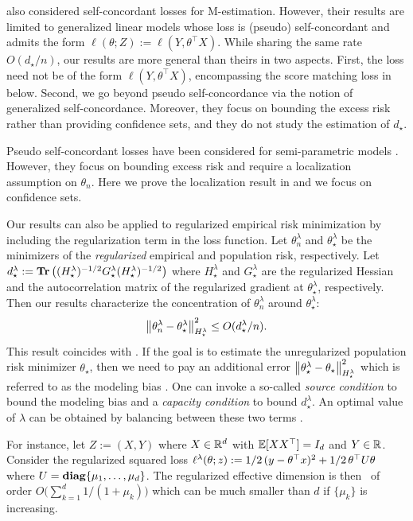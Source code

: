 \citet{ostrovskii2021finite} also considered self-concordant losses for M-estimation.
However, their results are limited to generalized linear models whose loss is (pseudo) self-concordant and admits the form $\ell(\theta; Z) := \ell(Y, \theta^\top X)$.
While sharing the same rate $O(d_\star / n)$, our results are more general than theirs in two aspects.
First, the loss need not be of the form $\ell(Y, \theta^\top X)$, encompassing the score matching loss in  below.
Second, we go beyond pseudo self-concordance via the notion of generalized self-concordance.
Moreover, they focus on bounding the excess risk rather than providing confidence sets, and they do not study the estimation of $d_\star$.

Pseudo self-concordant losses have been considered for semi-parametric models \citep{liu2022orthogonal}.
However, they focus on bounding excess risk and require a localization assumption on $\theta_n$. Here we prove the localization result in  and we focus on confidence sets.

Our results can also be applied to regularized empirical risk minimization by including the regularization term in the loss function.
Let $\theta_{n}^\lambda$ and $\theta_{\star}^\lambda$ be the minimizers of the \emph{regularized} empirical and population risk, respectively.
Let $d_\star^\lambda := \operatorname{\bf Tr}\big((H_\star^\lambda)^{-1/2} G_\star^{\lambda} (H_\star^\lambda)^{-1/2}\big)$ where $H_\star^{\lambda}$ and $G_\star^{\lambda}$ are the regularized Hessian and the autocorrelation matrix of the regularized gradient at $\theta_\star^\lambda$, respectively.
Then our results characterize the concentration of $\theta_{n}^\lambda$ around $\theta_{\star}^\lambda$:
\begin{align*}
    \left\lVert \theta_n^{\lambda} - \theta_\star^\lambda \right\rVert_{H_\star^\lambda}^2 \le O(d_\star^\lambda / n).
\end{align*}
This result coincides with \citet[Thm.~2.1]{spokoiny2017penalized}.
If the goal is to estimate the unregularized population risk minimizer $\theta_\star$, then we need to pay an additional error $\left\lVert \theta_\star^\lambda - \theta_\star \right\rVert_{H_\star^\lambda}^2$ which is referred to as the modeling bias \citep[Sec.~2.5]{spokoiny2017penalized}.
One can invoke a so-called \emph{source condition} to bound the modeling bias and a \emph{capacity condition} to bound $d_\star^\lambda$.
An optimal value of $\lambda$ can be obtained by balancing between these two terms \cite[see, e.g.,][]{marteau2019beyond}.

For instance, let $Z := (X, Y)$ where $X \in {\mathbb R}^d$ with $\operatorname{\mathbb E}[XX^\top] = I_d$ and $Y \in {\mathbb R}$.
Consider the regularized squared loss
$ \ell^\lambda(\theta; z) := 1/2\, (y - \theta^\top x)^2 + 1/2\, \theta^\top U \theta$
where $U = \operatorname{\bf diag}\{\mu_1, \dots, \mu_d\}$.
The regularized effective dimension is then~\citep[Sec.~2.1]{spokoiny2017penalized} of order 
$ O\big( \sum_{k=1}^d 1/(1 + \mu_k) \big)$
which can be much smaller than $d$ if $\{\mu_k\}$ is increasing.
